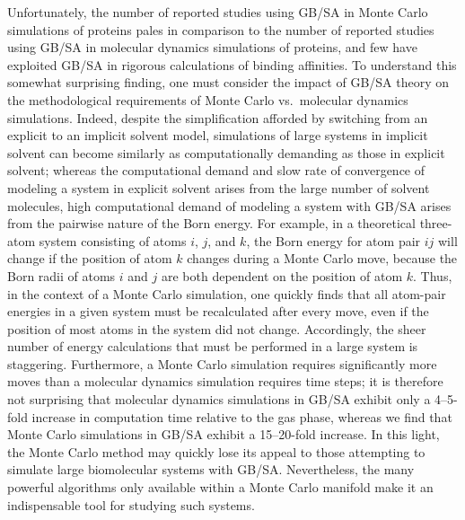 \documentclass[12pt]{report}
\begin{document}
Unfortunately, the number of reported studies using GB/SA in Monte Carlo simulations of proteins pales in comparison to the number of reported studies using GB/SA in molecular dynamics simulations of proteins, and few have exploited GB/SA in rigorous calculations of binding affinities. \cite{simonson, henchman, gallicchio, zhang} To understand this somewhat surprising finding, one must consider the impact of GB/SA theory on the methodological requirements of Monte Carlo vs.\ molecular dynamics simulations. Indeed, despite the simplification afforded by switching from an explicit to an implicit solvent model, simulations of large systems in implicit solvent can become similarly as computationally demanding as those in explicit solvent; whereas the computational demand and slow rate of convergence of modeling a system in explicit solvent arises from the large number of solvent molecules, high computational demand of modeling a system with GB/SA arises from the pairwise nature of the Born energy. For example, in a theoretical three-atom system consisting of atoms $i$, $j$, and $k$, the Born energy for atom pair $ij$ will change if the position of atom $k$ changes during a Monte Carlo move, because the Born radii of atoms $i$ and $j$ are both dependent on the position of atom $k$. Thus, in the context of a Monte Carlo simulation, one quickly finds that all atom-pair energies in a given system must be recalculated after every move, even if the position of most atoms in the system did not change. Accordingly, the sheer number of energy calculations that must be performed in a large system is staggering. Furthermore, a Monte Carlo simulation requires significantly more moves than a molecular dynamics simulation requires time steps; it is therefore not surprising that molecular dynamics simulations in GB/SA exhibit only a 4--5-fold increase in computation time relative to the gas phase,\cite{michel3} whereas we find that Monte Carlo simulations in GB/SA exhibit a 15--20-fold increase. In this light, the Monte Carlo method may quickly lose its appeal to those attempting to simulate large biomolecular systems with GB/SA. Nevertheless, the many powerful algorithms only available within a Monte Carlo manifold make it an indispensable tool for studying such systems.
\end{document}
